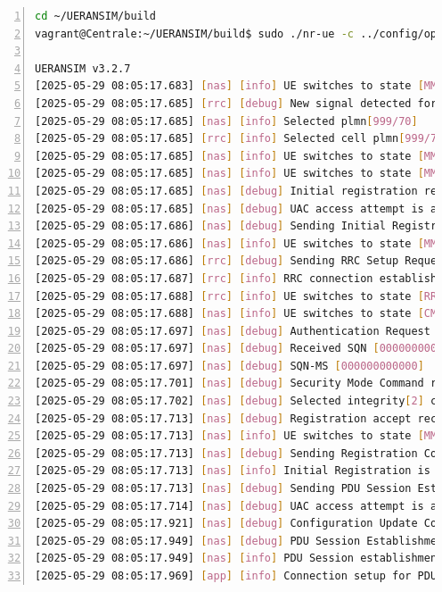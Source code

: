 \begin{lstlisting}[basicstyle=\small, frame=single, breaklines=true, postbreak=\mbox{\textcolor{red}{$\hookrightarrow$}\space}, escapeinside ={\%,}, escapechar={!}, numbers=left, language=sh, caption=UE run en resultaat]
cd ~/UERANSIM/build
vagrant@Centrale:~/UERANSIM/build$ sudo ./nr-ue -c ../config/open5gs-ue.yaml

UERANSIM v3.2.7
[2025-05-29 08:05:17.683] [nas] [info] UE switches to state [MM-DEREGISTERED/PLMN-SEARCH]
[2025-05-29 08:05:17.685] [rrc] [debug] New signal detected for cell[1], total [1] cells in coverage
[2025-05-29 08:05:17.685] [nas] [info] Selected plmn[999/70]
[2025-05-29 08:05:17.685] [rrc] [info] Selected cell plmn[999/70] tac[1] category[SUITABLE]
[2025-05-29 08:05:17.685] [nas] [info] UE switches to state [MM-DEREGISTERED/PS]
[2025-05-29 08:05:17.685] [nas] [info] UE switches to state [MM-DEREGISTERED/NORMAL-SERVICE]
[2025-05-29 08:05:17.685] [nas] [debug] Initial registration required due to [MM-DEREG-NORMAL-SERVICE]
[2025-05-29 08:05:17.685] [nas] [debug] UAC access attempt is allowed for identity[0], category[MO_sig]
[2025-05-29 08:05:17.686] [nas] [debug] Sending Initial Registration
[2025-05-29 08:05:17.686] [nas] [info] UE switches to state [MM-REGISTER-INITIATED]
[2025-05-29 08:05:17.686] [rrc] [debug] Sending RRC Setup Request
[2025-05-29 08:05:17.687] [rrc] [info] RRC connection established
[2025-05-29 08:05:17.688] [rrc] [info] UE switches to state [RRC-CONNECTED]
[2025-05-29 08:05:17.688] [nas] [info] UE switches to state [CM-CONNECTED]
[2025-05-29 08:05:17.697] [nas] [debug] Authentication Request received
[2025-05-29 08:05:17.697] [nas] [debug] Received SQN [000000000101]
[2025-05-29 08:05:17.697] [nas] [debug] SQN-MS [000000000000]
[2025-05-29 08:05:17.701] [nas] [debug] Security Mode Command received
[2025-05-29 08:05:17.702] [nas] [debug] Selected integrity[2] ciphering[0]
[2025-05-29 08:05:17.713] [nas] [debug] Registration accept received
[2025-05-29 08:05:17.713] [nas] [info] UE switches to state [MM-REGISTERED/NORMAL-SERVICE]
[2025-05-29 08:05:17.713] [nas] [debug] Sending Registration Complete
[2025-05-29 08:05:17.713] [nas] [info] Initial Registration is successful
[2025-05-29 08:05:17.713] [nas] [debug] Sending PDU Session Establishment Request
[2025-05-29 08:05:17.714] [nas] [debug] UAC access attempt is allowed for identity[0], category[MO_sig]
[2025-05-29 08:05:17.921] [nas] [debug] Configuration Update Command received
[2025-05-29 08:05:17.949] [nas] [debug] PDU Session Establishment Accept received
[2025-05-29 08:05:17.949] [nas] [info] PDU Session establishment is successful PSI[1]
[2025-05-29 08:05:17.969] [app] [info] Connection setup for PDU session[1] is successful, TUN interface[uesimtun0, 10.45.0.8] is up.
\end{lstlisting}

